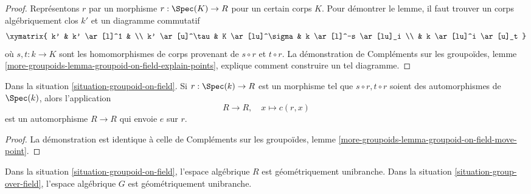 \begin{proof}
Représentons $r$ par un morphisme $r : \Spec(K) \to R$ pour un certain
corps $K$. Pour démontrer le lemme, il faut trouver un corps
algébriquement clos $k'$ et un diagramme commutatif
$$
\xymatrix{
k' & k' \ar[l]^1 & \\
k' \ar[u]^\tau & K \ar[lu]^\sigma & k \ar[l]^-s \ar[lu]_i \\
& k \ar[lu]^i \ar[u]_t
}
$$
où $s, t : k \to K$ sont les homomorphismes de corps provenant de
$s \circ r$ et $t \circ r$. La démonstration de
Compléments sur les groupoïdes,
lemme \ref{more-groupoids-lemma-groupoid-on-field-explain-points},
explique comment construire un tel diagramme.
\end{proof}

\begin{lemma}
\label{lemma-groupoid-on-field-move-point}
Dans la
situation \ref{situation-groupoid-on-field}.
Si $r : \Spec(k) \to R$ est un morphisme tel que
$s \circ r, t \circ r$ soient des automorphismes de $\Spec(k)$, alors l'application
$$
R \longrightarrow R, \quad
x \longmapsto c(r, x)
$$
est un automorphisme $R \to R$ qui envoie $e$ sur $r$.
\end{lemma}

\begin{proof}
La démonstration est identique à celle de
Compléments sur les groupoïdes,
lemme \ref{more-groupoids-lemma-groupoid-on-field-move-point}.
\end{proof}

\begin{lemma}
\label{lemma-groupoid-on-field-geometrically-irreducible}
Dans la
situation \ref{situation-groupoid-on-field},
l'espace algébrique $R$ est géométriquement unibranche. Dans la
situation \ref{situation-group-over-field},
l'espace algébrique $G$ est géométriquement unibranche.
\end{lemma}

